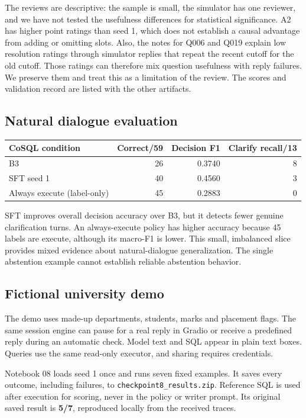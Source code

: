 \documentclass[11pt,a4paper]{article}
\newcommand{\file}[1]{\nolinkurl{#1}}
\begin{document}
The reviews are descriptive: the sample is small, the simulator has one reviewer, and we have not tested
the usefulness differences for statistical significance. A2 has higher point ratings than seed 1, which
does not establish a causal advantage from adding or omitting slots. Also, the notes for Q006 and Q019
explain low resolution ratings through simulator replies that repeat the recent cutoff for the old cutoff.
Those ratings can therefore mix question usefulness with reply failures. We preserve them and treat this
as a limitation of the review. The scores and validation record are listed with the other artifacts.

\subsection{Natural dialogue evaluation}

\begin{center}
\begin{tabular}{lrrr}
\toprule
CoSQL condition & Correct/59 & Decision F1 & Clarify recall/13 \\
\midrule
B3 & 26 & 0.3740 & 8 \\
SFT seed 1 & 40 & 0.4560 & 3 \\
Always execute (label-only) & 45 & 0.2883 & 0 \\
\bottomrule
\end{tabular}
\end{center}

SFT improves overall decision accuracy over B3, but it detects fewer genuine clarification turns.
An always-execute policy has higher accuracy because 45 labels are execute, although its macro-F1 is
lower. This small, imbalanced slice provides mixed evidence about natural-dialogue generalization.
The single abstention example cannot establish reliable abstention behavior.

\subsection{Fictional university demo}

The demo uses made-up departments, students, marks and placement flags. The same session engine can
pause for a real reply in Gradio or receive a predefined reply during an automatic check. Model text and
SQL appear in plain text boxes. Queries use the same read-only executor, and sharing requires credentials.

Notebook 08 loads seed 1 once and runs seven fixed examples. It saves every outcome, including failures,
to \file{checkpoint8_results.zip}. Reference SQL is used after execution for scoring, never in the policy
or writer prompt. Its original saved result is \textbf{5/7}, reproduced locally from the received traces.
\end{document}
